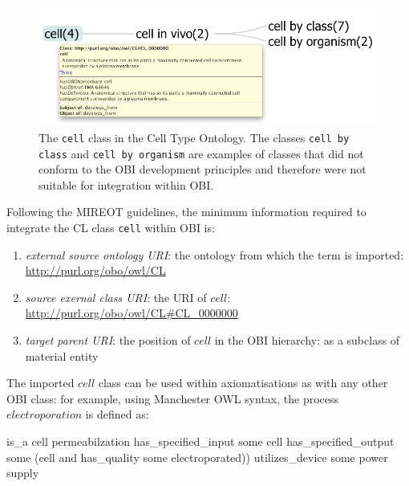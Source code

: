 \documentclass[a4paper,10pt,twocolumn]{article}
\begin{document}
\begin{figure}[t]
\centering \includegraphics*[width=1\columnwidth]{./figs/cell}
\caption{The \texttt{cell} class in the Cell Type Ontology. The classes \texttt{cell by class} and \texttt{cell by organism} are examples of classes that did not conform to the OBI development principles and therefore were not suitable for integration within OBI.}
\label{fig:cell}
\end{figure}

Following the MIREOT guidelines, the minimum information required to integrate the \ac{CL} class \texttt{cell} within OBI is:  

\begin{enumerate}
\item \textit{external source ontology URI}: the ontology from which the term is imported: \url{http://purl.org/obo/owl/CL}
\item \textit{source exernal class URI}: the URI of $cell$: \url{http://purl.org/obo/owl/CL#CL_0000000}
\item \textit{target parent URI}: the position of $cell$ in the OBI hierarchy: as a subclass of material entity %
\end{enumerate}

The imported $cell$ class can be used within axiomatisations as with any other OBI class: for example, using Manchester OWL syntax, the process $electroporation$ is defined as:


\begin{footnotesize}
\begin{verbatimtab}
   is_a cell permeabilzation
   has_specified_input some cell
   has_specified_output some 
     (cell and has_quality some electroporated))
   utilizes_device some power supply
\end{verbatimtab}
\end{footnotesize}
\end{document}
